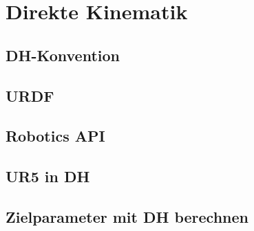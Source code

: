 \cleardoublepage
\chapter{Direkte Kinematik}

\section{DH-Konvention}

\section{URDF}

\section{Robotics API}

\section{UR5 in DH}

\section{Zielparameter mit DH berechnen}
